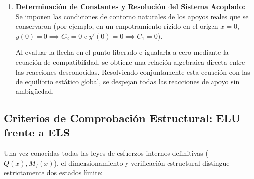 \begin{enumerate}
          \begin{equation}
              y''(x) = \frac{M_{f,z}(x)}{E \cdot I_z}
          \end{equation}
          se efectúa una doble integración indefinida respecto a $x$, generando las funciones analíticas del giro $y'(x)$ y de la flecha $y(x)$, las cuales contienen dos constantes de integración $C_1$ y $C_2$ por cada tramo analizado.
    \item \textbf{Determinación de Constantes y Resolución del Sistema Acoplado:}
          Se imponen las condiciones de contorno naturales de los apoyos reales que se conservaron (por ejemplo, en un empotramiento rígido en el origen $x = 0$, $y(0) = 0 \implies C_2 = 0$ e $y'(0) = 0 \implies C_1 = 0$).

          Al evaluar la flecha en el punto liberado e igualarla a cero mediante la ecuación de compatibilidad, se obtiene una relación algebraica directa entre las reacciones desconocidas. Resolviendo conjuntamente esta ecuación con las de equilibrio estático global, se despejan todas las reacciones de apoyo sin ambigüedad.
\end{enumerate}

\subsection{Criterios de Comprobación Estructural: ELU frente a ELS}

Una vez conocidas todas las leyes de esfuerzos internos definitivas ($Q(x), M_f(x)$), el dimensionamiento y verificación estructural distingue estrictamente dos estados límite:

